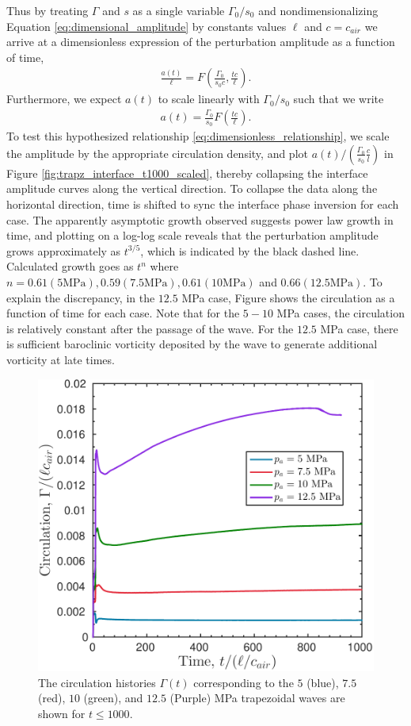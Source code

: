 Thus by treating $\Gamma$ and $s$ as a single variable $\Gamma_0/s_0$
and nondimensionalizing Equation \eqref{eq:dimensional_amplitude} by
constants values $\ell$ and $c=c_{air}$ we arrive at a dimensionless
expression of the perturbation amplitude as a function of time,
%
\begin{align}
  \label{eq:dimensionless_groups}
  \frac{a(t)}{\ell}=F\left(\frac{\Gamma_0}{s_0 c}, \frac{t c}{\ell} \right).
\end{align}
%
Furthermore, we expect $a(t)$ to scale linearly with $\Gamma_0/s_0$
such that we write
%
\begin{align}
  \label{eq:dimensionless_relationship}
  a(t)=\frac{\Gamma_0}{s_0}F\left(\frac{t c}{\ell} \right).
\end{align}
%
To test this hypothesized relationship
\eqref{eq:dimensionless_relationship}, we scale the amplitude by the
appropriate circulation density, and plot
$a(t)/\left(\frac{\Gamma_0}{s_0}\frac{c}{l}\right)$ in Figure
\ref{fig:trapz_interface_t1000_scaled}, thereby collapsing the
interface amplitude curves along the vertical direction. To collapse
the data along the horizontal direction, time is shifted to sync the
interface phase inversion for each case. The apparently asymptotic
growth observed suggests power law growth in time, and plotting on a
log-log scale reveals that the perturbation amplitude grows
approximately as $t^{3/5}$, which is indicated by the black dashed
line. Calculated growth goes as $t^n$ where
$n=0.61 (5 \text{MPa}), 0.59 (7.5 \text{MPa}), 0.61 (10 \text{MPa})$
and $0.66 (12.5 \text{MPa})$. To explain the discrepancy, in the $12.5$
MPa case, Figure shows the circulation as a function of time for each
case. Note that for the $5-10$ MPa cases, the circulation is
relatively constant after the passage of the wave. For the $12.5$ MPa
case, there is sufficient baroclinic vorticity deposited by the wave
to generate additional vorticity at late times.
%
\begin{figure}
  \centering
  \includegraphics[height=0.45\textwidth]{./figs/lung_figs/Circulation_t1000_23-Dec-2016}
  \caption[The circulation long time]{The circulation histories
    $\Gamma(t)$ corresponding to the $5$ (blue), $7.5$ (red), $10$
    (green), and $12.5$ (Purple) MPa trapezoidal waves are shown for
    $t\leq 1000$. }
  \label{fig:trapz_circ_t1000}
\end{figure}
